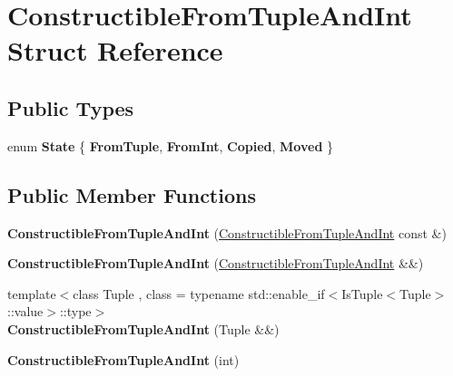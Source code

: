 \hypertarget{struct_constructible_from_tuple_and_int}{}\section{Constructible\+From\+Tuple\+And\+Int Struct Reference}
\label{struct_constructible_from_tuple_and_int}
\subsection*{Public Types}
\begin{DoxyCompactItemize}
\item 
\mbox{\label{struct_constructible_from_tuple_and_int_a59c5fc74bcd8e5b0efa5ee86a4d4658a}} 
enum {\bfseries State} \{ {\bfseries From\+Tuple}, 
{\bfseries From\+Int}, 
{\bfseries Copied}, 
{\bfseries Moved}
 \}
\end{DoxyCompactItemize}
\subsection*{Public Member Functions}
\begin{DoxyCompactItemize}
\item 
\mbox{\label{struct_constructible_from_tuple_and_int_a5d6d8fe8b3ae43da1f974fe99af47ca7}} 
{\bfseries Constructible\+From\+Tuple\+And\+Int} (\mbox{\hyperlink{struct_constructible_from_tuple_and_int}{Constructible\+From\+Tuple\+And\+Int}} const \&)
\item 
\mbox{\label{struct_constructible_from_tuple_and_int_a2377327959f89969bcd5d6e0bf81b7dc}} 
{\bfseries Constructible\+From\+Tuple\+And\+Int} (\mbox{\hyperlink{struct_constructible_from_tuple_and_int}{Constructible\+From\+Tuple\+And\+Int}} \&\&)
\item 
\mbox{\label{struct_constructible_from_tuple_and_int_a073f1a78392d4381ddd34cf44c40e644}} 
{\footnotesize template$<$class Tuple , class  = typename std\+::enable\+\_\+if$<$\+Is\+Tuple$<$\+Tuple$>$\+::value$>$\+::type$>$ }\\{\bfseries Constructible\+From\+Tuple\+And\+Int} (Tuple \&\&)
\item 
\mbox{\label{struct_constructible_from_tuple_and_int_ae81000e1e8d91b49d9bd1ba761583a76}} 
{\bfseries Constructible\+From\+Tuple\+And\+Int} (int)
\end{DoxyCompactItemize}
